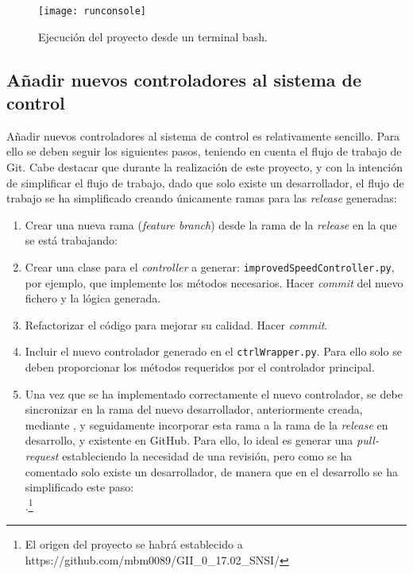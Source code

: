 \begin{figure}[H]
	\centering
	\texttt{[image: runconsole]}
	\caption[Ejecución del proyecto desde terminal]{Ejecución del proyecto desde un terminal bash.}\label{fig:runconsole}
\end{figure}

\subsection{Añadir nuevos controladores al sistema de control}

Añadir nuevos controladores al sistema de control es relativamente sencillo. Para ello se deben seguir los siguientes pasos, teniendo en cuenta el flujo de trabajo de Git. Cabe destacar que durante la realización de este proyecto, y con la intención de simplificar el flujo de trabajo, dado que solo existe un desarrollador, el flujo de trabajo se ha simplificado creando únicamente ramas para las \emph{release} generadas: 
\begin{enumerate}
\item Crear una nueva rama (\emph{feature branch}) desde la rama de la \emph{release} en la que se está trabajando:\\ 
  
\item Crear una clase para el \emph{controller} a generar: \texttt{improvedSpeedController.py}, por ejemplo, que implemente los métodos necesarios. Hacer \emph{commit} del nuevo fichero y la lógica generada.
\item Refactorizar el código para mejorar su calidad. Hacer \emph{commit}.
\item Incluir el nuevo controlador generado en el \texttt{ctrlWrapper.py}. Para ello solo se deben proporcionar los métodos requeridos por el controlador principal. 
\item Una vez que se ha implementado correctamente el nuevo controlador, se debe sincronizar en la rama del nuevo desarrollador, anteriormente creada, mediante , y seguidamente incorporar esta rama a la rama de la \emph{release} en desarrollo, y existente en GitHub. Para ello, lo ideal es generar una \emph{pull-request} estableciendo la necesidad de una revisión, pero como se ha comentado solo existe un desarrollador, de manera que en el desarrollo se ha simplificado este paso:\\ .\footnote{El origen del proyecto se habrá establecido a https://github.com/mbm0089/GII\_0\_17.02\_SNSI/}
\end{enumerate}

